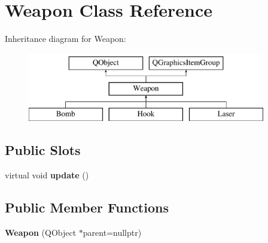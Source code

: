 \hypertarget{classWeapon}{\section{Weapon Class Reference}
\label{classWeapon}
}
Inheritance diagram for Weapon\-:\begin{figure}[H]
\begin{center}
\leavevmode
\includegraphics[height=3.000000cm]{classWeapon}
\end{center}
\end{figure}
\subsection*{Public Slots}
\begin{DoxyCompactItemize}
\item 
\hypertarget{classWeapon_a1b3f76c5275b67f0bb8073157a27e736}{virtual void {\bfseries update} ()}\label{classWeapon_a1b3f76c5275b67f0bb8073157a27e736}

\end{DoxyCompactItemize}
\subsection*{Public Member Functions}
\begin{DoxyCompactItemize}
\item 
\hypertarget{classWeapon_a2795df670e0b34ac1fe20bb51ba0cfeb}{{\bfseries Weapon} (Q\-Object $\ast$parent=nullptr)}\label{classWeapon_a2795df670e0b34ac1fe20bb51ba0cfeb}

\end{DoxyCompactItemize}
